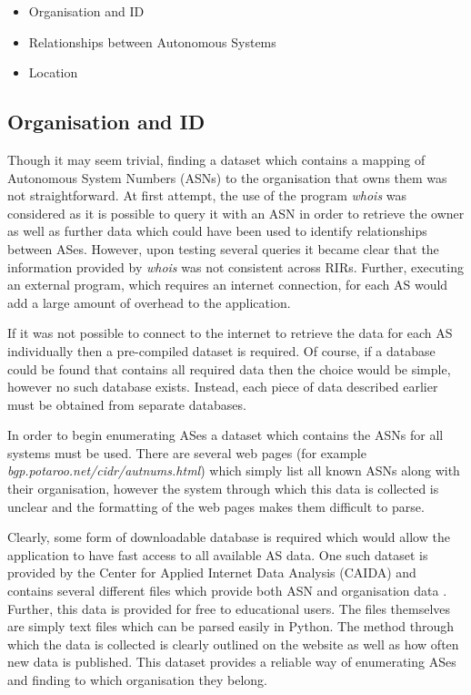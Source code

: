 \begin{itemize}
	\item{Organisation and ID}
	\item{Relationships between Autonomous Systems}
	\item{Location}
\end{itemize}

\subsection{Organisation and ID}
Though it may seem trivial, finding a dataset which contains a mapping of Autonomous System Numbers (ASNs) to the organisation that owns them was not straightforward. At first attempt, the use of the program \textit{whois} was considered as it is possible to query it with an ASN in order to retrieve the owner as well as further data which could have been used to identify relationships between ASes. However, upon testing several queries it became clear that the information provided by \textit{whois} was not consistent across RIRs. Further, executing an external program, which requires an internet connection, for each AS would add a large amount of overhead to the application. 

If it was not possible to connect to the internet to retrieve the data for each AS individually then a pre-compiled dataset is required. Of course, if a database could be found that contains all required data then the choice would be simple, however no such database exists. Instead, each piece of data described earlier must be obtained from separate databases. 

In order to begin enumerating ASes a dataset which contains the ASNs for all systems must be used. There are several web pages (for example \textit{bgp.potaroo.net/cidr/autnums.html}) which simply list all known ASNs along with their organisation, however the system through which this data is collected is unclear and the formatting of the web pages makes them difficult to parse. 

Clearly, some form of downloadable database is required which would allow the application to have fast access to all available AS data. One such dataset is provided by the Center for Applied Internet Data Analysis (CAIDA) and contains several different files which provide both ASN and organisation data \cite{org_mapping_caida_2015}. Further, this data is provided for free to educational users. The files themselves are simply text files which can be parsed easily in Python. The method through which the data is collected is clearly outlined on the website as well as how often new data is published. This dataset provides a reliable way of enumerating ASes and finding to which organisation they belong.

